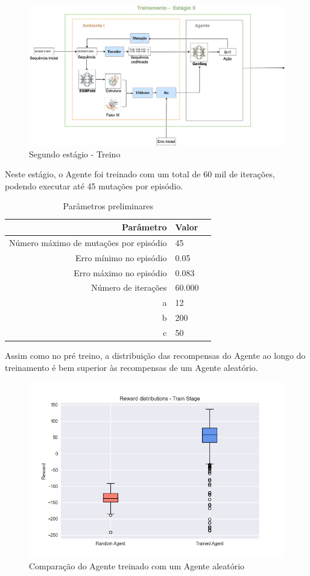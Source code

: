 \begin{figure}[H]
  \centering
  \includegraphics[width=.8\textwidth]{figuras/metodologia-Training.jpg}
  \caption{Segundo estágio - Treino}
\end{figure}

Neste estágio, o Agente foi treinado com um total de 60 mil de iterações, podendo executar até 45 mutações por episódio. 

\begin{table}[H]
  \centering
  \vspace{0.5cm}
  \begin{tabular}{r|lr}
  Parâmetro & Valor \\ 
  \hline                               %
  Número máximo de mutações por episódio & 45 \\
  Erro mínimo no episódio & 0.05 \\
  Erro máximo no episódio & 0.083 \\
  Número de iterações & 60.000 \\
  a & 12 \\
  b & 200 \\
  c & 50 \\
  \end{tabular}
  \caption{Parâmetros preliminares}
  \end{table}

  Assim como no pré treino, a distribuição das recompensas do Agente ao longo do treinamento é 
  bem superior às recompensas de um Agente aleatório.  
  \begin{figure}[H]
    \centering
    \includegraphics[width=.8\linewidth]{figuras/plot_box_train_reward.jpg}  
    \caption{Comparação do Agente treinado com um Agente aleatório}
    \label{fig:box-train}
  \end{figure}

